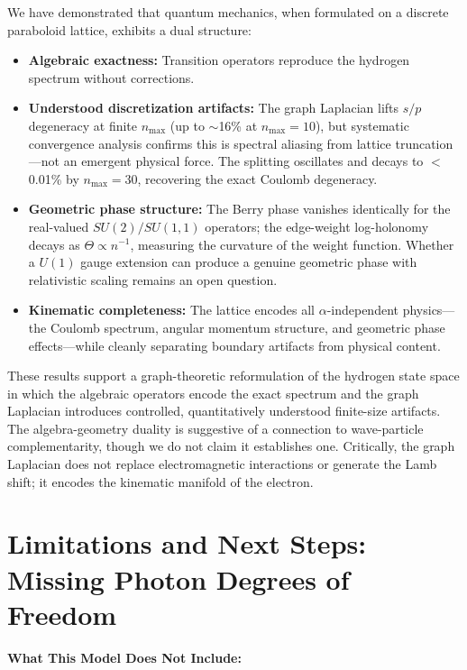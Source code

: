 \documentclass[aps,pra,twocolumn,superscriptaddress,longbibliography]{revtex4-2}
\begin{document}
We have demonstrated that quantum mechanics, when formulated on a discrete paraboloid lattice, exhibits a dual structure:
\begin{itemize}
\item \textbf{Algebraic exactness:} Transition operators reproduce the hydrogen spectrum without corrections.
\item \textbf{Understood discretization artifacts:} The graph Laplacian lifts $s/p$ degeneracy at finite $n_{\max}$ (up to $\sim$16\% at $n_{\max}=10$), but systematic convergence analysis confirms this is spectral aliasing from lattice truncation---not an emergent physical force. The splitting oscillates and decays to $<$0.01\% by $n_{\max}=30$, recovering the exact Coulomb degeneracy.
\item \textbf{Geometric phase structure:} The Berry phase vanishes identically for the real-valued $SU(2)/SU(1,1)$ operators; the edge-weight log-holonomy decays as $\Theta \propto n^{-1}$, measuring the curvature of the weight function. Whether a $U(1)$ gauge extension can produce a genuine geometric phase with relativistic scaling remains an open question.
\item \textbf{Kinematic completeness:} The lattice encodes all $\alpha$-independent physics---the Coulomb spectrum, angular momentum structure, and geometric phase effects---while cleanly separating boundary artifacts from physical content.
\end{itemize}

These results support a graph-theoretic reformulation of the hydrogen state space in which the algebraic operators encode the exact spectrum and the graph Laplacian introduces controlled, quantitatively understood finite-size artifacts. The algebra-geometry duality is suggestive of a connection to wave-particle complementarity, though we do not claim it establishes one. Critically, the graph Laplacian does not replace electromagnetic interactions or generate the Lamb shift; it encodes the kinematic manifold of the electron.


\section{Limitations and Next Steps: Missing Photon Degrees of Freedom}
\label{sec:limitations}

\textbf{What This Model Does Not Include:}
\end{document}
